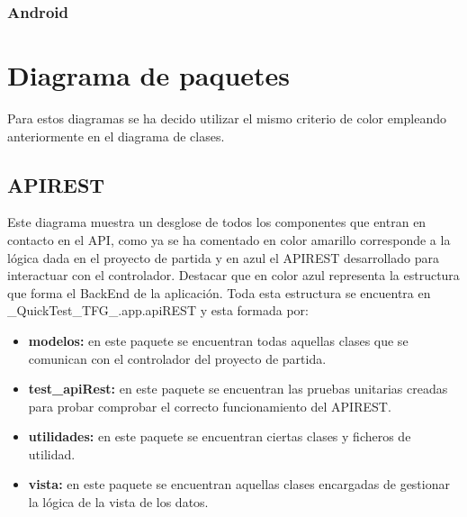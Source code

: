 
\begin{landscape}
\subsubsection{Android}
\end{landscape}



\section{Diagrama de paquetes}

Para estos diagramas se ha decido utilizar el mismo criterio de color empleando anteriormente en el diagrama de clases.

\subsection{APIREST}

Este diagrama muestra un desglose de todos los componentes que entran en contacto en el API, como ya se ha comentado en color amarillo corresponde a la lógica dada en el proyecto de partida y en azul el APIREST desarrollado para interactuar con el controlador. Destacar que en color azul representa la estructura que forma el BackEnd de la aplicación. Toda esta estructura se encuentra en  
\_QuickTest\_TFG\_.app.apiREST y esta formada por:

\begin{itemize}

	\item \textbf{modelos:} en este paquete se encuentran todas aquellas clases que se comunican con el controlador del proyecto de partida.
	\item \textbf{test\_apiRest:} en este paquete se encuentran las pruebas unitarias creadas para probar comprobar el correcto funcionamiento del APIREST.
	\item \textbf{utilidades:} en este paquete se encuentran ciertas clases y ficheros de utilidad.
	\item \textbf{vista:} en este paquete se encuentran aquellas clases encargadas de gestionar la lógica de la vista de los datos.

\end{itemize}


